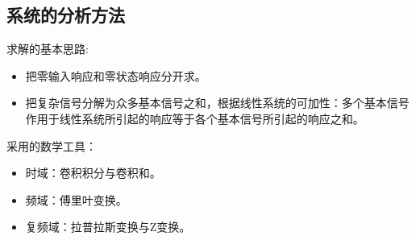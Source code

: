 \subsection{系统的分析方法}

求解的基本思路:

\begin{itemize}
    \item 把零输入响应和零状态响应分开求。
    \item 把复杂信号分解为众多基本信号之和，根据线性系统的可加性：多个基本信号作用于线性系统所引起的响应等于各个基本信号所引起的响应之和。
\end{itemize}

采用的数学工具：
\begin{itemize}
    \item 时域：卷积积分与卷积和。
    \item 频域：傅里叶变换。
    \item 复频域：拉普拉斯变换与Z变换。
\end{itemize}